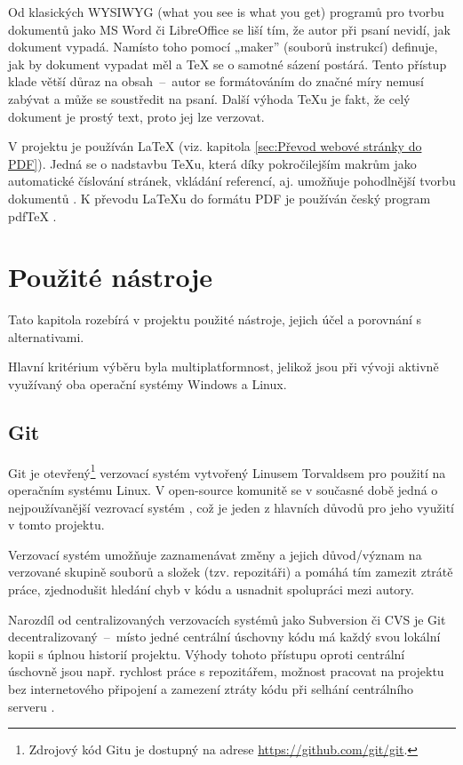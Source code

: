 \documentclass[a4paper, 12pt]{article}
\begin{document}
  Od klasických WYSIWYG (what you see is what you get) programů pro tvorbu dokumentů jako MS Word či LibreOffice se liší tím, že autor při psaní nevidí, jak dokument vypadá. Namísto toho pomocí „maker” (souborů instrukcí) definuje, jak by dokument vypadat měl a \TeX{} se o samotné sázení postárá. Tento přístup klade větší důraz na obsah~--~autor se formátováním do značné míry nemusí zabývat a může se soustředit na psaní. Další výhoda \TeX u je fakt, že celý dokument je prostý text, proto jej lze verzovat.

  V projektu je používán \LaTeX{} (viz. kapitola \ref{sec:Převod webové stránky do PDF}). Jedná se o nadstavbu \TeX u, která díky pokročilejším makrům jako automatické číslování stránek, vkládání referencí, aj. umožňuje pohodlnější tvorbu dokumentů \cite{getting-started-with-latex}. K převodu \LaTeX u do formátu PDF je používán český program pdf\TeX{} \cite{pdftex}.


  \section{Použité nástroje} \label{sec:Použité nástroje}
  Tato kapitola rozebírá v projektu použité nástroje, jejich účel a porovnání s alternativami.

  Hlavní kritérium výběru byla multiplatformnost, jelikož jsou při vývoji aktivně využívaný oba operační systémy Windows a Linux.


  \subsection{Git} \label{sec:Git}
  Git je otevřený\footnote{Zdrojový kód Gitu je dostupný na adrese \url{https://github.com/git/git}.} verzovací systém vytvořený Linusem Torvaldsem pro použití na operačním systému Linux. V open-source komunitě se v současné době jedná o nejpoužívanější vezrovací systém \cite{version-control-usage-statistics}, což je jeden z hlavních důvodů pro jeho využití v tomto projektu.

  Verzovací systém umožňuje zaznamenávat změny a jejich důvod/význam na verzované skupině souborů a složek (tzv. repozitáři) a pomáhá tím zamezit ztrátě práce, zjednodušit hledání chyb v kódu a usnadnit spolupráci mezi autory.

  Narozdíl od centralizovaných verzovacích systémů jako Subversion či CVS je Git decentralizovaný~--~místo jedné centrální úschovny kódu má každý svou lokální kopii s úplnou historií projektu. Výhody tohoto přístupu oproti centrální úschovně jsou např. rychlost práce s repozitářem, možnost pracovat na projektu bez internetového připojení a zamezení ztráty kódu při selhání centrálního serveru \cite{cvcs-vs-dvcs}.
\end{document}
